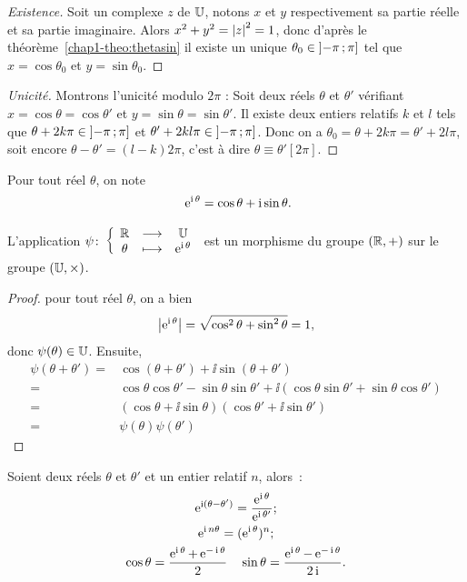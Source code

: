 \begin{proof}[Existence]
  Soit un complexe \(z\) de \(\mathbb{U}\), notons \(x\) et \(y\) respectivement sa partie réelle et sa partie imaginaire. Alors \(x^2+y^2=\left\lvert z\right\rvert^2=1\), donc d'après le théorème~\ref{chap1-theo:thetasin} il existe un unique \(\theta_0 \in \left] -\pi \, ;  \pi \right]\) tel que \(x=\cos\theta_0\) et \(y=\sin\theta_0\).
\end{proof}
\begin{proof}[Unicité]
  Montrons l'unicité modulo \(2\pi\) : Soit deux réels \(\theta\) et \(\theta'\) vérifiant  \(x=\cos \theta=\cos \theta'\) et \(y=\sin \theta = \sin \theta'\). Il existe deux entiers relatifs \(k\) et \(l\) tels que \(\theta +2k \pi \in \left] -\pi \, ;  \pi \right]\) et \(\theta' +2kl \pi \in \left] -\pi \, ;  \pi \right]\). Donc on a \(\theta_0=\theta + 2k \pi=\theta'+2l \pi\), soit encore \(\theta-\theta'=(l-k) 2\pi\), c'est à dire \(\theta \equiv \theta' [2\pi]\).
\end{proof}
%
\begin{defdef}
  Pour tout réel \(\theta\), on note
  \begin{equation}\
    \operatorname{e}^{\operatorname{i} \theta}=\cos\theta +\operatorname{i}\sin\theta.
  \end{equation}
\end{defdef}
%
\begin{prop}
  L'application \(\psi\colon \left\{\begin{array}{ccc} \mathbb{R} & \longrightarrow &\mathbb{U}\\ \theta & \longmapsto & \operatorname{e}^{\operatorname{i} \theta} \end{array} \right.\) est un morphisme du groupe \((\mathbb{R},+)\) sur le groupe \((\mathbb{U},\times)\).
\end{prop}
\begin{proof}
  pour tout réel \(\theta\), on a bien
  \begin{equation}
    \left\lvert\operatorname{e}^{\operatorname{i} \theta}\right\rvert=\sqrt{\cos^2 \theta + \sin^2 \theta}=1,
  \end{equation}
  donc \(\psi(\theta) \in \mathbb{U}\). Ensuite,
  \begin{align}
    \psi(\theta +\theta') = &\cos(\theta +\theta') + \ii \sin(\theta + \theta')\\
    =&\cos \theta \cos \theta' - \sin \theta \sin \theta' +\ii(\cos \theta \sin \theta' + \sin \theta \cos \theta')\\
    =&(\cos \theta + \ii \sin \theta)(\cos \theta' + \ii \sin \theta')\\
    =&\psi(\theta) \psi(\theta')
  \end{align}
\end{proof}
%
\begin{prop} Soient deux réels \(\theta\) et \(\theta'\) et un entier relatif \(n\), alors~:
  \begin{gather}
    \operatorname{e}^{\operatorname{i} (\theta-\theta')}=\frac{\operatorname{e}^{\operatorname{i} \theta}}{\operatorname{e}^{\operatorname{i} \theta'}};\\
    \operatorname{e}^{\operatorname{i} n \theta}=(\operatorname{e}^{\operatorname{i} \theta})^n;\\
    \cos \theta = \frac{\operatorname{e}^{\operatorname{i} \theta}+\operatorname{e}^{-\operatorname{i}\theta}}{2} \quad \sin \theta = \frac{\operatorname{e}^{\operatorname{i} \theta}-\operatorname{e}^{-\operatorname{i}\theta}}{2\operatorname{i}}.
  \end{gather}
\end{prop}
